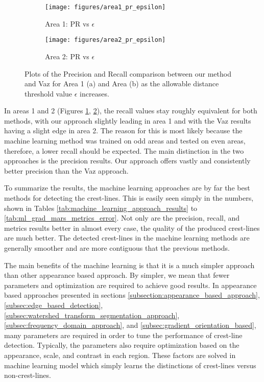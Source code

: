 \begin{figure}
	\centering
	\begin{subfigure}{0.48\textwidth}
		\centering
		\texttt{[image: figures/area1\_pr\_epsilon]}
		\caption{ Area 1: PR vs $\epsilon$}
		\label{fig:precision_recall_vs_epsilon_area1}
	\end{subfigure}
	\begin{subfigure}{0.48\textwidth}
		\centering
		\texttt{[image: figures/area2\_pr\_epsilon]}
		\caption{ Area 2: PR vs $\epsilon$}
		\label{fig:precision_recall_vs_epsilon_area2}
	\end{subfigure}
	\caption{ Plots of the Precision and Recall comparison between our method and Vaz \cite{vaz_object_based_dune_analysis} for Area 1 (a) and Area (b) as the allowable distance threshold value $\epsilon$ increases. }
	\label{fig:precision_recall_vs_epsilon}
\end{figure}

In areas 1 and 2 (Figures \ref{fig:precision_recall_vs_epsilon_area1}, \ref{fig:precision_recall_vs_epsilon_area2}), the recall values stay roughly equivalent for both methods, with our approach slightly leading in area 1 and with the Vaz results having a slight edge in area 2. The reason for this is most likely because the machine learning method was trained on odd areas and tested on even areas, therefore, a lower recall should be expected. The main distinction in the two approaches is the precision results. Our approach offers vastly and consistently better precision than the Vaz approach.

To summarize the results, the machine learning approaches are by far the best methods for detecting the crest-lines. This is easily seen simply in the numbers, shown in Tables \ref{tab:machine_learning_approach_results} to \ref{tab:ml_grad_mars_metrics_error}. Not only are the precision, recall, and metrics results better in almost every case, the quality of the produced crest-lines are much better. The detected crest-lines in the machine learning methods are generally smoother and are more contiguous that the previous methods.

The main benefits of the machine learning is that it is a much simpler approach than other appearance based approach. By simpler, we mean that fewer parameters and optimization are required to achieve good results. In appearance based approaches presented in sections \ref{subsection:appearance_based_approach}, \ref{subsec:edge_based_detection}, \ref{subsec:watershed_transform_segmentation_approach}, \ref{subsec:frequency_domain_approach}, and \ref{subsec:gradient_orientation_based}, many parameters are required in order to tune the performance of crest-line detection. Typically, the parameters also require optimization based on the appearance, scale, and contrast in each region. These factors are solved in machine learning model which simply learns the distinctions of crest-lines versus non-crest-lines.

